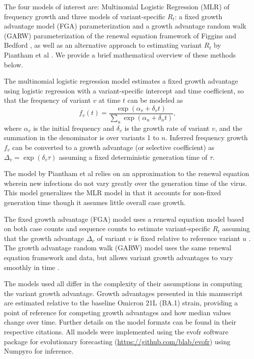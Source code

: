 \documentclass[10pt,letterpaper]{article}
\begin{document}
The four models of interest are: Multinomial Logistic Regression (MLR) of frequency growth and three models of variant-specific $R_t$: a fixed growth advantage model (FGA) parameterization and a growth advantage random walk (GARW) parameterization of the renewal equation framework of Figgins and Bedford \cite{figgins2022sars}, as well as an alternative approach to estimating variant $R_t$ by Piantham et al \cite{piantham2021estimating}.
We provide a brief mathematical overview of these methods below.

The multinomial logistic regression model estimates a fixed growth advantage using logistic regression with a variant-specific intercept and time coefficient, so that the frequency of variant $v$ at time $t$ can be modeled as
\begin{equation}
    f_{v}(t) = \frac{\exp(\alpha_{v} + \delta_{v} t)}{\sum_{u} \exp(\alpha_{u} + \delta_{u} t)},
\end{equation}
where $\alpha_v$ is the initial frequency and $\delta_v$ is the growth rate of variant $v$, and the summation in the denominator is over variants 1 to $n$.
Inferred frequency growth $f_v$ can be converted to a growth advantage (or selective coefficient) as $\Delta_{v} = \exp(\delta_{v} \tau)$ assuming a fixed deterministic  generation time of $\tau$.

The model by Piantham et al \cite{piantham2021estimating} relies on an approximation to the renewal equation wherein new infections do not vary greatly over the generation time of the virus.
This model generalizes the MLR model in that it accounts for non-fixed generation time though it assumes little overall case growth.

The fixed growth advantage (FGA) model uses a renewal equation model based on both case counts and sequence counts to estimate variant-specific $R_t$ assuming that the growth advantage $\Delta_{v}$ of variant $v$ is fixed relative to reference variant $u$ \cite{figgins2022sars}.
The growth advantage random walk (GARW) model uses the same renewal equation framework and data, but allows variant growth advantages to vary smoothly in time \cite{figgins2022sars}.

The models used all differ in the complexity of their assumptions in computing the variant growth advantage.
Growth advantages presented in this manuscript are estimated relative to the baseline Omicron 21L (BA.1) strain, providing a point of reference for competing growth advantages and how median values change over time.
Further details on the model formats can be found in their respective citations.
All models were implemented using the evofr software package for evolutionary forecasting (\href{https://github.com/blab/evofr}{https://github.com/blab/evofr}) using Numpyro for inference.
\end{document}
